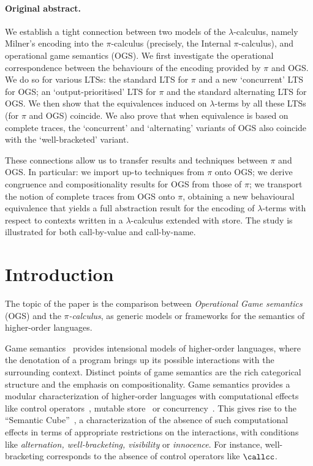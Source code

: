 \paragraph{Original abstract.} 
 We establish a tight connection between two models of the $\lambda$-calculus, 
 namely Milner's encoding into the $\pi$-calculus (precisely, the Internal $\pi$-calculus), 
 and operational game semantics (OGS).
 We first investigate the operational correspondence between 
 the behaviours of the encoding provided by
 $\pi$ and OGS. 
 We do so for various LTSs:  the standard LTS for  
 $\pi$ and a new 
 `concurrent' LTS for OGS;  an `output-prioritised' LTS for  $\pi$ 
 and the standard alternating LTS for OGS.  We then show that the equivalences induced on
 $\lambda$-terms by all these LTSs (for $\pi$ and OGS) coincide. 
 We also prove that when equivalence is based on complete traces,  
 the `concurrent' and `alternating' variants of   OGS 
 also coincide with the `well-bracketed' variant. 

 These connections allow us to transfer results and techniques between $\pi$ and OGS. In
 particular: 
 we import up-to techniques from $\pi$ onto OGS; we derive
 congruence and compositionality results for OGS from those of $\pi$; 
 we transport the notion of complete traces from OGS onto $\pi$, obtaining a new  
 behavioural equivalence that yields a full abstraction result for the encoding of
 $\lambda$-terms with respect to contexts written in a $\lambda$-calculus extended with store. 
%
 The study is illustrated for both call-by-value and call-by-name.


\section{Introduction}
\label{s:intro}
             

The topic of the paper is the comparison between 
\emph{Operational Game semantics} (OGS) and the \emph{$\pi$-calculus}, as generic
models or frameworks for the semantics of higher-order languages.  

Game semantics~\cite{10.1006/inco.2000.2917,10.1006/inco.2000.2930} provides
intensional models of higher-order languages,
where the denotation of a program brings up its possible  interactions with the
surrounding context.
Distinct points of game semantics are the 
rich categorical structure and the emphasis on compositionality.
Game semantics provides a modular characterization of higher-order languages with
 computational effects like control operators~\cite{10.5555/788019.788859}, 
 mutable store~\cite{abramsky1997linearity,10.5555/788020.788891} 
 or concurrency~\cite{ghica2004angelic,10.1007/11944836_38}.
 This gives rise to the ``Semantic Cube''~\cite{10.5555/645726.667210},
 a characterization of the absence of such computational effects
 in terms of appropriate restrictions on the interactions, with conditions
 like \emph{alternation, well-bracketing, visibility} or \emph{innocence}.
For instance, well-bracketing corresponds to the absence of control operators
like $\callcc$.

